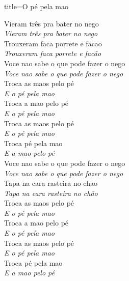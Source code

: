 \documentclass[fontsize=14pt, paper=a4, twoside, DIV=20]{scrreprt} %
\begin{document}
\begin{multicols*}{2}
\begin{song}{title={O pé pela mao}}
        \begin{verse*}
            Vieram três pra bater no nego\\
            \textit{Vieram três pra bater no nego}\\
            Trouxeram faca porrete e facao\\
            \textit{Trouxeram faca porrete e facão}\\
            Voce nao sabe o que pode fazer o nego\\
            \textit{Voce nao sabe o que pode fazer o nego}\\
            Troca as maos pelo pé\\
            \textit{E o pé pela mao}\\
            Troca a mao pelo pé\\
            \textit{E o pé pela mao}\\
            Troca as maos pelo pé\\
            \textit{E o pé pela mao}\\
            Troca pé pela mao\\
            \textit{E a mao pelo pé}\\
            Voce nao sabe o que pode fazer o nego\\
            \textit{Voce nao sabe o que pode fazer o nego}\\
            Tapa na cara rasteira no chao\\
            \textit{Tapa na cara rasteira no chão}\\
            Troca as maos pelo pé\\
            \textit{E o pé pela mao}\\
            Troca a mao pelo pé\\
            \textit{E o pé pela mao}\\
            Troca as maos pelo pé\\
            \textit{E o pé pela mao}\\
            Troca pé pela mao\\
            \textit{E a mao pelo pé}\\
        \end{verse*}
\end{song}



\end{multicols*}
\end{document}
